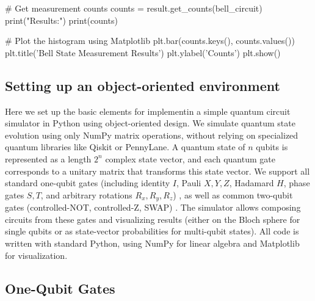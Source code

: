 \documentclass[%
oneside,                 %
final,                   %
10pt]{article}
\begin{document}
# Get measurement counts
counts = result.get_counts(bell_circuit)
print("\nMeasurement Results:")
print(counts)

# Plot the histogram using Matplotlib
plt.bar(counts.keys(), counts.values())
plt.title('Bell State Measurement Results')
plt.ylabel('Counts')
plt.show()

\epycod


\subsection{Setting up an object-oriented environment}

Here we set up the basic elements for implementin a simple quantum circuit simulator in Python
using object-oriented design. We simulate quantum state evolution
using only NumPy matrix operations, without relying on specialized
quantum libraries like Qiskit or PennyLane. A quantum state of $n$
qubits is represented as a length $2^n$ complex state vector, and each
quantum gate corresponds to a unitary matrix that transforms this
state vector. We support all standard one-qubit gates (including
identity $I$, Pauli $X,Y,Z$, Hadamard $H$, phase gates $S,T$, and
arbitrary rotations $R_x, R_y, R_z$) , as well as common two-qubit
gates (controlled-NOT, controlled-Z, SWAP) . The simulator allows
composing circuits from these gates and visualizing results (either on
the Bloch sphere for single qubits or as state-vector probabilities
for multi-qubit states). All code is written with standard Python,
using NumPy for linear algebra and Matplotlib for visualization.

\subsection{One-Qubit Gates}
\end{document}
